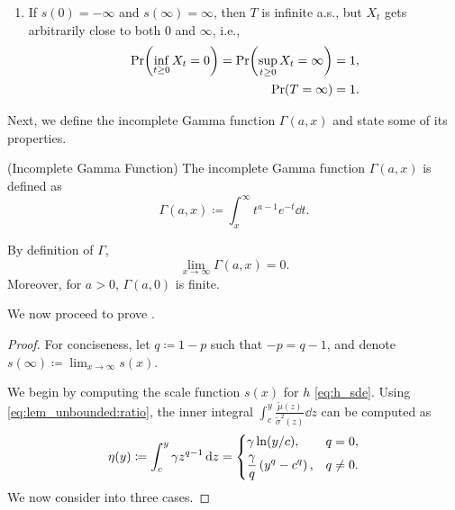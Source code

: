 \documentclass[twocolumn,amsthm]{autart}
\newcommand{\lft}{\mathopen{}\mathclose\bgroup\left}
\newcommand{\rht}{\aftergroup\egroup\right}
\begin{document}
\begin{appendix}
\begin{thm}
\begin{enumerate}
\begin{equation}
        \end{equation}
\item If $s(0) = -\infty$ and $s(\infty) = \infty$, then $T$ is infinite a.s., but $X_t$ gets arbitrarily close to both $0$ and $\infty$, i.e.,
        \begin{align}
            \Pr\lft(\inf_{t\geq0} X_t = 0\rht) = \Pr\lft(\sup_{t \geq 0} X_t = \infty \rht) &= 1, \\
            \Pr\lft(T = \infty\rht) &= 1.
        \end{align}
    \end{enumerate}
\end{thm}
\begin{thm}[]
\end{thm}

Next, we define the incomplete Gamma function $\Gamma(a, x)$ \cite{gautschi1998incomplete,tricomi1950sulla} and state some of its properties.
\begin{defn}{(Incomplete Gamma Function)}
    The incomplete Gamma function $\Gamma(a, x)$ is defined as
    \begin{equation}
        \Gamma(a, x) \coloneqq \int_x^\infty t^{a - 1} e^{-t} \dd{t}.
    \end{equation}
\end{defn}
\begin{lem}{}
    By definition of $\Gamma$,
    \begin{equation} \label{eq:gamma_limit}
        \lim_{x \to \infty} \Gamma(a, x) = 0.
    \end{equation}
    Moreover, for $a > 0$, $\Gamma(a, 0)$ is finite.
\end{lem}

We now proceed to prove .
\begin{proof}
    For conciseness, let $q \coloneqq 1 - p$ such that $-p = q - 1$, and denote $s(\infty) \coloneqq \lim_{x \to \infty} s(x)$.

    We begin by computing the scale function $s(x)$ for $h$ \eqref{eq:h_sde}.
    Using \eqref{eq:lem_unbounded:ratio}, the inner integral $\int_c^y \frac{\tilde{\mu}(z)}{\tilde{\sigma}^2(z)} \dd{z}$ can be computed as
    \begin{equation}
        \eta(y) \coloneqq \int_c^y \gamma z^{q - 1} \dd{z} = \begin{dcases} \gamma \ln(y / c), & q = 0, \\ \frac{\gamma}{q} \left( y^{q} - c^{q} \right), & q \neq 0. \end{dcases}
    \end{equation}
    We now consider into three cases.


\end{proof}
\end{appendix}
\end{document}
